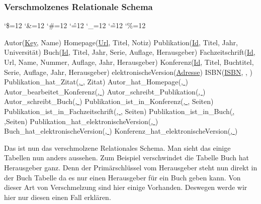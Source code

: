 \documentclass[a4paper,12pt]{article}
\newenvironment{simplechar}{%
	\catcode`\$=12
	\catcode`\&=12
	\catcode`\#=12
	\catcode`\^=12
	\catcode`\_=12
	\catcode`\~=12
	\catcode`\%=12
}{}
\begin{document}
	\subsubsection{Verschmolzenes Relationale Schema}
	\newpage
	\begin{simplechar}
		\begin{flushleft}
		\begin{small}
			Autor(\uline{Key}, Name)\newline
			Homepage(\uline{Url}, Titel, Notiz)\newline
			Publikation(\uline{Id}, Titel, Jahr, Universität)\newline
			Buch(\uline{Id}, Titel, Jahr, Serie, Auflage, Herausgeber)\newline
			Fachzeitschrift(\uline{Id}, Url, Name, Nummer, Auflage, Jahr, Herausgeber)\newline
			Konferenz(\uline{Id}, Titel, Buchtitel, Serie, Auflage, Jahr, Herausgeber)\newline
			elektronischeVersion(\uline{Adresse})\newline
			ISBN(\uline{ISBN}, , )\newline
			Publikation_hat_Zitat(\uline{, }, Zitat)\newline
			Autor_hat_Homepage(\uline{, })\newline
			Autor_bearbeitet_Konferenz(\uline{, })\newline
			Autor_schreibt_Publikation(\uline{, })\newline
			Autor_schreibt_Buch(\uline{, })\newline
			Publikation_ist_in_Konferenz(\uline{, }, Seiten)\newline
			Publikation_ist_in_Fachzeitschrift(\uline{, }, Seiten)\newline
			Publikation_ist_in_Buch(\uline{, },Seiten)\newline
			Publikation_hat_elektronischeVersion(\uline{, })\newline
			Buch_hat_elektronischeVersion(\uline{, })\newline
			Konferenz_hat_elektronischeVersion(\uline{, })\newline
		\end{small}
	\end{flushleft}
	\end{simplechar}
	Das ist nun das verschmolzene Relationales Schema. Man sieht das einige Tabellen nun anders aussehen. Zum Beispiel verschwindet die Tabelle Buch hat Herausgeber ganz. Denn der Primärschlüssel vom Herausgeber steht nun direkt in der Buch Tabelle da es nur einen Herausgeber für ein Buch geben kann. Von dieser Art von Verschmelzung sind hier einige Vorhanden. Deswegen werde wir hier nur diesen einen Fall erklären.
	
\end{document}
